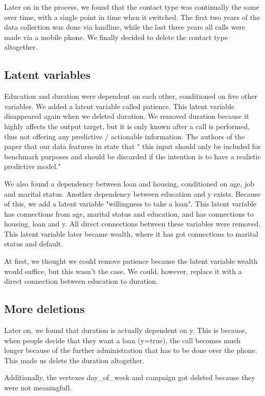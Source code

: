 \documentclass[11pt]{article}
\begin{document}
\begin{multicols}{2}
Later on in the process, we found that the contact type was
continually the same over time, with a single point in time when it switched. The first two years of the data collection was done
via landline, while the last three years all calls were made via a mobile phone.
We finally decided to delete the contact type altogether. 

\subsection{Latent variables}
Education and duration were dependent on each other, conditioned on five other
variables. We added a latent variable called patience. This latent variable
disappeared again when we deleted duration. We removed duration because it highly affects the output target, but it is only known after a call is performed, thus not offering any predictive / actionable information.
The authors of the paper that our data features in state that " this input should only be included for benchmark purposes and should be discarded if the intention is to have a realistic predictive model."

We also found a dependency between loan and housing, conditioned on age, job and
marital status. Another dependency between education and y exists. Because of
this, we add a latent variable "willingness to take a loan". This latent
variable has connections from age, marital status and education, and has
connections to housing, loan and y. All direct connections between these
variables were removed. This latent variable later became wealth, where it has
got connections to marital status and default. 

At first, we thought we could remove patience because the latent variable wealth
would suffice, but this wasn't the case. We could, however, replace it with a
direct connection between education to duration. 

\subsection{More deletions}
Later on, we found that duration is actually dependent on y. This is because,
when people decide that they want a loan (y=true), the call becomes much longer
because of the further administration that has to be done over the phone. This
made us delete the duration altogether. 

Additionally, the vertexes day\_of\_week and campaign got deleted because they
were not meaningfull. 


\end{multicols}
\end{document}
